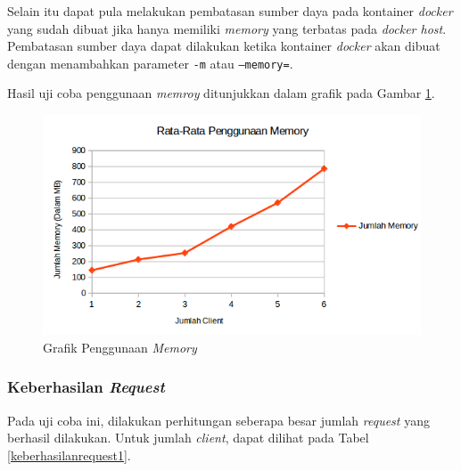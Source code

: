 Selain itu dapat pula melakukan pembatasan sumber daya pada kontainer \textit{docker} yang sudah dibuat jika hanya memiliki \textit{memory} yang terbatas pada \textit{docker host}. Pembatasan sumber daya dapat dilakukan ketika kontainer \textit{docker} akan dibuat dengan menambahkan parameter \texttt{-m} atau \texttt{--memory=}.

Hasil uji coba penggunaan \textit{memroy} ditunjukkan dalam grafik pada Gambar \ref{ram1}.

\begin{figure}[H]
	\centering
	\includegraphics[width=\linewidth]{images/bab5/newmemory}
	\caption{Grafik Penggunaan \textit{Memory}}
	\label{ram1}
\end{figure}

\subsubsection{Keberhasilan \textit{Request}}
Pada uji coba ini, dilakukan perhitungan seberapa besar jumlah \textit{request} yang berhasil dilakukan. Untuk jumlah \textit{client}, dapat dilihat pada Tabel \ref{keberhasilanrequest1}.

